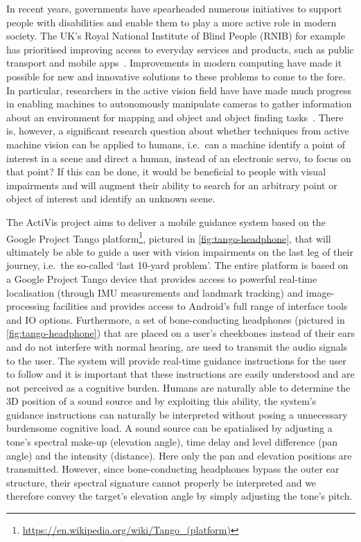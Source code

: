 \documentclass{llncs}
\begin{document}
In recent years, governments have spearheaded numerous initiatives to support people with disabilities and enable them to play a more active role in modern society.
The UK's Royal National Institute of Blind People (RNIB) for example has prioritised improving access to everyday services and products, such as public transport and mobile apps~\cite{rnib-objectives}.
Improvements in modern computing have made it possible for new and innovative solutions to these problems to come to the fore.
In particular, researchers in the active vision field have have made much progress in enabling machines to autonomously manipulate cameras to gather information about an environment for mapping and object and object finding tasks~\cite{bajcsy2018revisiting}.
There is, however, a significant research question about whether techniques from active machine vision can be applied to humans, i.e.\ can a machine identify a point of interest in a scene and direct a human, instead of an electronic servo, to focus on that point?
If this can be done, it would be beneficial to people with visual impairments and will augment their ability to search for an arbitrary point or object of interest and identify an unknown scene. 

The ActiVis project aims to deliver a mobile guidance system based on the Google Project Tango platform\footnote{\url{https://en.wikipedia.org/wiki/Tango\_(platform)}}, pictured in \cref{fig:tango-headphone}, that will ultimately be able to guide a user with vision impairments on the last leg of their journey, i.e.\ the so-called `last 10-yard problem'. 
The entire platform is based on a Google Project Tango device that provides access to powerful real-time localisation (through IMU measurements and landmark tracking) and image-processing facilities and provides access to Android's full range of interface tools and IO options. 
Furthermore, a set of bone-conducting headphones (pictured in \cref{fig:tango-headphone}) that are placed on a user's cheekbones instead of their ears and do not interfere with normal hearing, are used to transmit the audio signals to the user.
The system will provide real-time guidance instructions for the user to follow and it is important that these instructions are easily understood and are not perceived as a cognitive burden. 
Humans are naturally able to determine the 3D position of a sound source and by exploiting this ability, the system's guidance instructions can naturally be interpreted without posing a unnecessary burdensome cognitive load.
A sound source can be spatialised by adjusting a tone's spectral make-up (elevation angle), time delay and level difference (pan angle) and the intensity (distance).
Here only the pan and elevation positions are transmitted.
However, since bone-conducting headphones bypass the outer ear structure, their spectral signature cannot properly be interpreted and we therefore convey the target's elevation angle by simply adjusting the tone's pitch.
\end{document}
